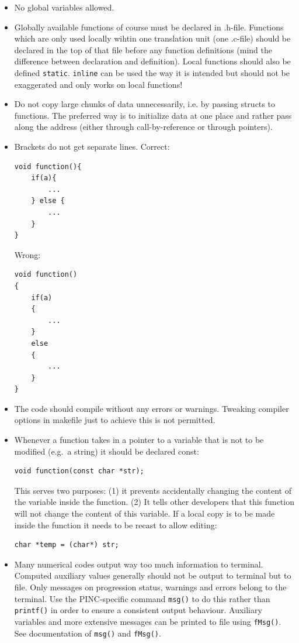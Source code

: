 \documentclass[10pt,a4paper]{article}
\begin{document}
\begin{itemize}
	\item No global variables allowed.
	\item Globally available functions of course must be declared in .h-file. Functions which are only used locally wihtin one translation unit (one .c-file) should be declared in the top of that file before any function definitions (mind the difference between declaration and definition). Local functions should also be defined \lstinline$static$. \lstinline$inline$ can be used the way it is intended but should not be exaggerated and only works on local functions!
	\item Do not copy large chunks of data unnecessarily, i.e. by passing structs to functions. The preferred way is to initialize data at one
	place and rather pass along the address (either through call-by-reference or through pointers).
	\item Brackets do not get separate lines. Correct:
\begin{lstlisting}
void function(){
	if(a){
		...
	} else {
		...
	}
}
\end{lstlisting}
	Wrong:
\begin{lstlisting}
void function()
{
	if(a)
	{
		...
	}
	else
	{
		...
	}
}
\end{lstlisting}
	\item The code should compile without any errors or warnings. Tweaking compiler options in makefile just to achieve this is not permitted.	
	\item Whenever a function takes in a pointer to a variable that is not to be modified (e.g.\ a string) it should be declared const:
	\begin{lstlisting}
void function(const char *str);
	\end{lstlisting}
	This serves two purposes: (1) it prevents accidentally changing the content of the variable inside the function. (2) It tells other developers that this function will not change the content of this variable. If a local copy is to be made inside the function it needs to be recast to allow editing:
	\begin{lstlisting}
char *temp = (char*) str;
	\end{lstlisting}
	\item Many numerical codes output way too much information to terminal. Computed auxiliary values generally should not be output to terminal but to file. Only messages on progression status, warnings and errors belong to the terminal. Use the PINC-specific command \lstinline$msg()$ to do this rather than \lstinline$printf()$ in order to ensure a consistent output behaviour. Auxiliary variables and more extensive messages can be printed to file using \lstinline$fMsg()$. See documentation of \lstinline$msg()$ and \lstinline$fMsg()$.

\end{itemize}
\end{document}
